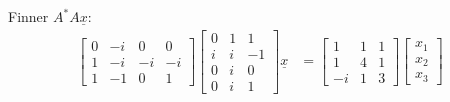 \documentclass[11pt, a4paper, norsk]{NTNUoving}
\begin{document}
\begin{oppgave}
\begin{punkt}
            Finner $A^{*}A\underline{x}$:
            \begin{align*}
                \begin{bmatrix}
                0 & -i & 0 & 0 \\
                1 & -i & -i & -i \\
                1 & -1 & 0 & 1
                \end{bmatrix} \begin{bmatrix}
                0 & 1 & 1 \\
                i & i & -1 \\
                0 & i & 0 \\
                0 & i & 1
            \end{bmatrix} \underline{x} &= \begin{bmatrix}
            1 & 1 & 1 \\
            1 & 4 & 1 \\
            -i & 1 & 3
            \end{bmatrix}\begin{bmatrix}
                x_1 \\
                x_2 \\
                x_3
            \end{bmatrix}
            \end{align*}
                

\end{punkt}
\end{oppgave}
\end{document}
